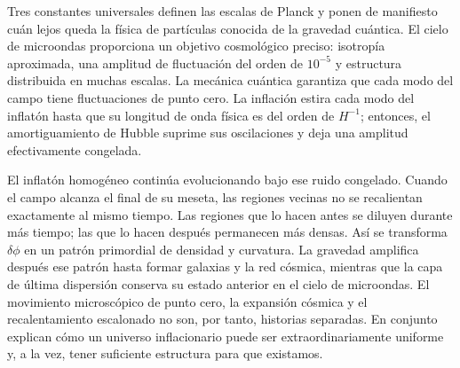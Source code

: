 Tres constantes universales definen las escalas de Planck y ponen de manifiesto cuán lejos queda la física de partículas conocida de la gravedad cuántica. El cielo de microondas proporciona un objetivo cosmológico preciso: isotropía aproximada, una amplitud de fluctuación del orden de \(10^{-5}\) y estructura distribuida en muchas escalas. La mecánica cuántica garantiza que cada modo del campo tiene fluctuaciones de punto cero. La inflación estira cada modo del inflatón hasta que su longitud de onda física es del orden de \(H^{-1}\); entonces, el amortiguamiento de Hubble suprime sus oscilaciones y deja una amplitud efectivamente congelada.

El inflatón homogéneo continúa evolucionando bajo ese ruido congelado. Cuando el campo alcanza el final de su meseta, las regiones vecinas no se recalientan exactamente al mismo tiempo. Las regiones que lo hacen antes se diluyen durante más tiempo; las que lo hacen después permanecen más densas. Así se transforma \(\delta\phi\) en un patrón primordial de densidad y curvatura. La gravedad amplifica después ese patrón hasta formar galaxias y la red cósmica, mientras que la capa de última dispersión conserva su estado anterior en el cielo de microondas. El movimiento microscópico de punto cero, la expansión cósmica y el recalentamiento escalonado no son, por tanto, historias separadas. En conjunto explican cómo un universo inflacionario puede ser extraordinariamente uniforme y, a la vez, tener suficiente estructura para que existamos.